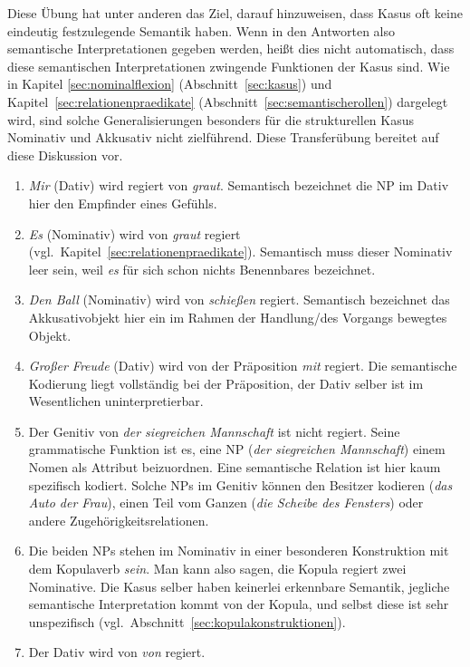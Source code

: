 Diese Übung hat unter anderen das Ziel, darauf hinzuweisen, dass Kasus oft keine eindeutig festzulegende Semantik haben.
Wenn in den Antworten also semantische Interpretationen gegeben werden, heißt dies nicht automatisch, dass diese semantischen Interpretationen zwingende Funktionen der Kasus sind.
Wie in Kapitel \ref{sec:nominalflexion} (Abschnitt~\ref{sec:kasus}) und Kapitel~\ref{sec:relationenpraedikate} (Abschnitt~\ref{sec:semantischerollen}) dargelegt wird, sind solche Generalisierungen besonders für die strukturellen Kasus Nominativ und Akkusativ nicht zielführend.
Diese Transferübung bereitet auf diese Diskussion vor.

\begin{enumerate}\Lf
  \item \textit{Mir} (Dativ) wird regiert von \textit{graut}.
    Semantisch bezeichnet die NP im Dativ hier den Empfinder eines Gefühls.
  \item \textit{Es} (Nominativ) wird von \textit{graut} regiert (vgl.\ Kapitel~\ref{sec:relationenpraedikate}).
    Semantisch muss dieser Nominativ leer sein, weil \textit{es} für sich schon nichts Benennbares bezeichnet.
  \item \textit{Den Ball} (Nominativ) wird von \textit{schießen} regiert.
    Semantisch bezeichnet das Akkusativobjekt hier ein im Rahmen der Handlung/des Vorgangs bewegtes Objekt.
  \item \label{it:ex-morph-123} \textit{Großer Freude} (Dativ) wird von der Präposition \textit{mit} regiert.
    Die semantische Kodierung liegt vollständig bei der Präposition, der Dativ selber ist im Wesentlichen uninterpretierbar.
  \item Der Genitiv von \textit{der siegreichen Mannschaft} ist nicht regiert.
    Seine grammatische Funktion ist es, eine NP (\textit{der siegreichen Mannschaft}) einem Nomen als Attribut beizuordnen.
    Eine semantische Relation ist hier kaum spezifisch kodiert.
    Solche NPs im Genitiv können den Besitzer kodieren (\textit{das Auto der Frau}), einen Teil vom Ganzen (\textit{die Scheibe des Fensters}) oder andere Zugehörigkeitsrelationen.
  \item Die beiden NPs stehen im Nominativ in einer besonderen Konstruktion mit dem Kopulaverb \textit{sein}.
    Man kann also sagen, die Kopula regiert zwei Nominative.
    Die Kasus selber haben keinerlei erkennbare Semantik, jegliche semantische Interpretation kommt von der Kopula, und selbst diese ist sehr unspezifisch (vgl.\ Abschnitt~\ref{sec:kopulakonstruktionen}).
  \item Der Dativ wird von \textit{von} regiert.

\end{enumerate}
